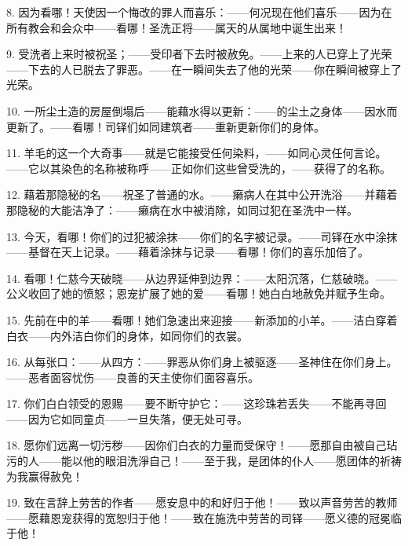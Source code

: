 8. 因为看哪！天使因一个悔改的罪人而喜乐：——何况现在他们喜乐——因为在所有教会和会众中——看哪！圣洗正将——属天的从属地中诞生出来！\par

9. 受洗者上来时被祝圣；——受印者下去时被赦免。——上来的人已穿上了光荣——下去的人已脱去了罪恶。——在一瞬间失去了他的光荣——你在瞬间被穿上了光荣。\par

10. 一所尘土造的房屋倒塌后——能藉水得以更新：——的尘土之身体——因水而更新了。——看哪！司铎们如同建筑者——重新更新你们的身体。\par

11. 羊毛的这一个大奇事——就是它能接受任何染料，——如同心灵任何言论。——它以其染色的名称被称呼——正如你们这些曾受洗的，——获得了的名称。\par

12. 藉着那隐秘的名——祝圣了普通的水。——癞病人在其中公开洗浴——并藉着那隐秘的大能洁净了：——癞病在水中被消除，如同过犯在圣洗中一样。\par

13. 今天，看哪！你们的过犯被涂抹——你们的名字被记录。——司铎在水中涂抹——基督在天上记录。——藉着涂抹与记录——看哪！你们的喜乐加倍了。\par

14. 看哪！仁慈今天破晓——从边界延伸到边界：——太阳沉落，仁慈破晓。——公义收回了她的愤怒；恩宠扩展了她的爱——看哪！她白白地赦免并赋予生命。\par

15. 先前在中的羊——看哪！她们急速出来迎接——新添加的小羊。——洁白穿着白衣——内外洁白你们的身体，如同你们的衣裳。\par

16. 从每张口：——从四方：——罪恶从你们身上被驱逐——圣神住在你们身上。——恶者面容忧伤——良善的天主使你们面容喜乐。\par

17. 你们白白领受的恩赐——要不断守护它：——这珍珠若丢失——不能再寻回——因为它如同童贞——一旦失落，便无处可寻。\par

18. 愿你们远离一切污秽——因你们白衣的力量而受保守！——愿那自由被自己玷污的人——能以他的眼泪洗淨自己！——至于我，是团体的仆人——愿团体的祈祷为我赢得赦免！\par

19. 致在言辞上劳苦的作者——愿安息中的和好归于他！——致以声音劳苦的教师——愿藉恩宠获得的宽恕归于他！——致在施洗中劳苦的司铎——愿义德的冠冕临于他！\par

